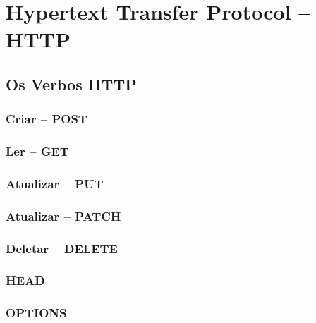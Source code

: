 \chapter{Hypertext Transfer Protocol -- HTTP}

\section{Os Verbos HTTP}
\subsection{Criar -- POST}
\subsection{Ler -- GET}
\subsection{Atualizar -- PUT}
\subsection{Atualizar -- PATCH}
\subsection{Deletar -- DELETE}
\subsection{HEAD}
\subsection{OPTIONS}